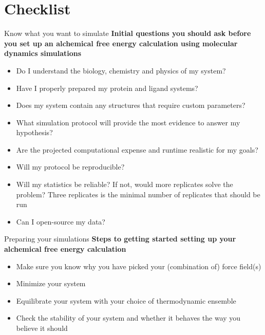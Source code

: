 \documentclass[9pt,bestpractices]{livecoms}
\begin{document}
\clearpage

\section{Checklist}
\label{sec:checklist}
\begin{Checklists*}[p!]
\begin{checklist}{ Know what you want to simulate}
    \textbf{Initial questions you should ask before you set up an alchemical free energy calculation using molecular dynamics simulations}
\begin{itemize}
    \item Do I understand the biology, chemistry and physics of my system?
    \item Have I properly prepared my protein and ligand systems?
    \item Does my system contain any structures that require custom parameters?
    \item What simulation protocol will provide the most evidence to answer my hypothesis?
    \item Are the projected computational expense and runtime realistic for my goals?
    \item Will my protocol be reproducible? 
    \item Will my statistics be reliable? If not, would more replicates solve the problem? Three replicates is the minimal number of replicates that should be run
    \item Can I open-source my data?
\end{itemize}
\end{checklist}

\begin{checklist}{Preparing your simulations}
\textbf{Steps to getting started setting up your alchemical free energy calculation}
\begin{itemize}
    \item Make sure you know why you have picked your (combination of) force field(s)
    \item Minimize your system
    \item Equilibrate your system with your choice of thermodynamic ensemble
    \item Check the stability of your system and whether it behaves the way you believe it should
\end{itemize}
\end{checklist}


\end{Checklists*}
\end{document}
